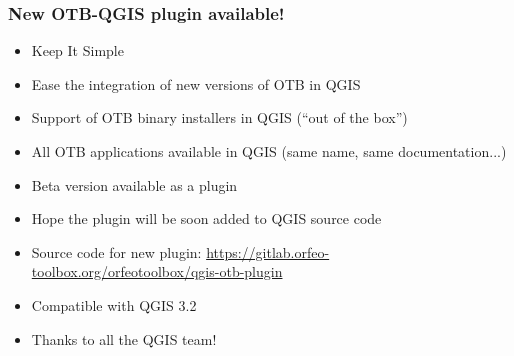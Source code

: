 \documentclass[8pt]{beamer}
\begin{document}
\begin{frame}
  \frametitle{New OTB-QGIS plugin available!}
  \begin{itemize}
  \item Keep It Simple
  \item Ease the integration of new versions of OTB in QGIS
  \item Support of OTB binary installers in QGIS (``out of the box'')
  \item All OTB applications available in QGIS (same name, same documentation...)  
  \item \alert{Beta version} available as a plugin
  \item Hope the plugin will be soon added to QGIS source code
  \item
    Source code for new plugin: \url{https://gitlab.orfeo-toolbox.org/orfeotoolbox/qgis-otb-plugin}
  \item Compatible with QGIS 3.2
  \item Thanks to all the QGIS team!
  \end{itemize}
\end{frame}
\end{document}
